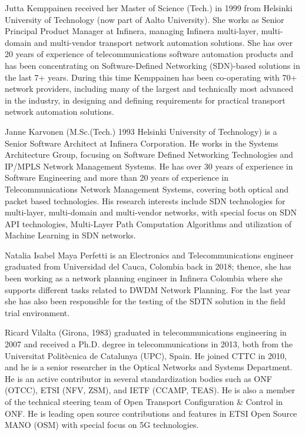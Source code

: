 \documentclass[a4paper,fleqn]{cas-dc}
\begin{document}
Jutta Kemppainen received her Master of Science (Tech.) in 1999 from Helsinki University of Technology (now part of Aalto University). She works as Senior Principal Product Manager at Infinera, managing Infinera multi-layer, multi-domain and multi-vendor transport network automation solutions. She has over 20 years of experience of telecommunications software automation products and has been concentrating on Software-Defined Networking (SDN)-based solutions in the last 7+ years. During this time Kemppainen has been co-operating with 70+ network providers, including many of the largest and technically most advanced in the industry, in designing and defining requirements for practical transport network automation solutions.
\endbio

Janne Karvonen (M.Sc.(Tech.) 1993 Helsinki University of Technology) is a Senior Software Architect at Infinera Corporation. He works in the Systems Architecture Group, focusing on Software Defined Networking Technologies and IP/MPLS Network Management Systems. He has over 30 years of experience in Software Engineering and more than 20 years of experience in Telecommunications Network Management Systems, covering both optical and packet based technologies. His research interests include SDN technologies for multi-layer, multi-domain and multi-vendor networks, with special focus on SDN API technologies, Multi-Layer Path Computation Algorithms and utilization of Machine Learning in SDN networks.
\endbio

Natalia Isabel Maya Perfetti is an Electronics and Telecommunications engineer graduated from Universidad del Cauca, Colombia back in 2018; thence, she has been working as a network planning engineer in Infinera Colombia where she supports different tasks related to DWDM Network Planning. For the last year she has also been responsible for the testing of the SDTN solution in the field trial environment.
\endbio

Ricard Vilalta (Girona, 1983) graduated in telecommunications engineering in 2007 and received a Ph.D. degree in telecommunications in 2013, both from the Universitat Politècnica de Catalunya (UPC), Spain. He joined CTTC in 2010, and he is a senior researcher in the Optical Networks and Systems Department. He is an active contributor in several standardization bodies such as ONF (OTCC), ETSI (NFV, ZSM), and IETF (CCAMP, TEAS). He is also a member of the technical steering team of Open Transport Configuration & Control in ONF. He is leading open source contributions and features in ETSI Open Source MANO (OSM) with special focus on 5G technologies.
\endbio
\end{document}
